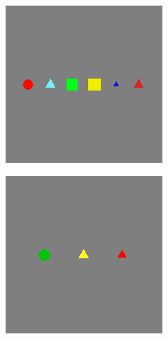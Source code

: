 \begin{figure}
	\centering
	\begin{subfigure}{.21\textwidth}
		\includegraphics[width=\textwidth]{imgs/cem/KANDY_1-T12-pos.png}
		\caption{}%
\end{subfigure}
\begin{subfigure}{.21\textwidth}
	\includegraphics[width=\textwidth]{imgs/cem/KANDY_1-T12-neg.png}

\end{subfigure}
\end{figure}

